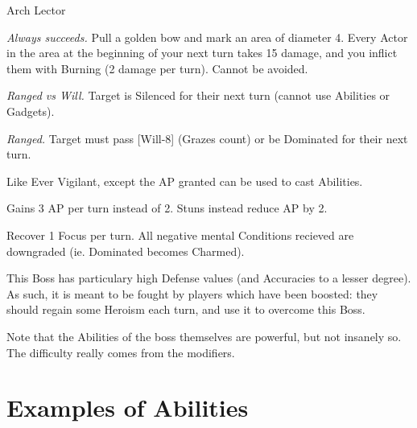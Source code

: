 \begin{monsterboxbg}{Arch Lector}
    \begin{rpg-monsteraction}
        \textit{Always succeeds.} Pull a golden bow and mark an area of diameter 4. Every Actor in the area at the beginning of your next turn takes 15 damage, and you inflict them with Burning (2 damage per turn). Cannot be avoided.
    \end{rpg-monsteraction}

    \begin{rpg-monsteraction}
        \textit{Ranged vs Will.} Target is Silenced for their next turn (cannot use Abilities or Gadgets).
    \end{rpg-monsteraction}

    \begin{rpg-monsteraction}[Dominate]
        \textit{Ranged.} Target must pass [Will-8] (Grazes count) or be Dominated for their next turn.
    \end{rpg-monsteraction}


    \begin{rpg-monsteraction}
        Like Ever Vigilant, except the AP granted can be used to cast Abilities.
    \end{rpg-monsteraction}
        
    \begin{rpg-monsteraction}[Boss]
        Gains 3 AP per turn instead of 2. Stuns instead reduce AP by 2.
    \end{rpg-monsteraction}

    \begin{rpg-monsteraction}
        Recover 1 Focus per turn. All negative mental Conditions recieved are downgraded (ie. Dominated becomes Charmed).
    \end{rpg-monsteraction}

    This Boss has particulary high Defense values (and Accuracies to a lesser degree). As such, it is meant to be fought by players which have been boosted: they should regain some Heroism each turn, and use it to overcome this Boss.

    Note that the Abilities of the boss themselves are powerful, but not insanely so. The difficulty really comes from the modifiers.

\end{monsterboxbg}



\section{Examples of Abilities}

